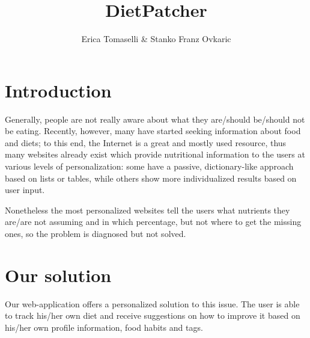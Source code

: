 \documentclass{article}
\begin{document}
\title{\huge \textbf{DietPatcher}}
\author{Erica Tomaselli \& Stanko Franz Ovkaric}
\date{}
\maketitle


\section{Introduction}


Generally, people are not really aware about what they are/should be/should not be eating. Recently, however, many have started seeking information about food and diets; to this end, the Internet is a great and mostly used resource, thus many websites already exist which provide nutritional information to the users at various levels of personalization: some have a passive, dictionary-like approach based on lists or tables, while others show more individualized results based on user input.

Nonetheless the most personalized websites tell the users what nutrients they are/are not assuming and in which percentage, but not where to get the missing ones, so the problem is diagnosed but not solved.

\section{Our solution}
Our web-application offers a personalized solution to this issue. The user is able to track his/her own diet and receive suggestions on how to improve it based on his/her own profile information, food habits and tags.
\end{document}
